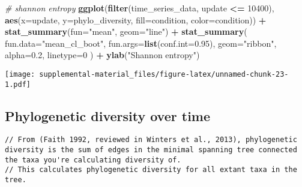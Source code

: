 \documentclass[]{book}
\newenvironment{Shaded}{\begin{snugshade}}{\end{snugshade}}
\newcommand{\CommentTok}[1]{\textcolor[rgb]{0.56,0.35,0.01}{\textit{#1}}}
\newcommand{\DataTypeTok}[1]{\textcolor[rgb]{0.13,0.29,0.53}{#1}}
\newcommand{\DecValTok}[1]{\textcolor[rgb]{0.00,0.00,0.81}{#1}}
\newcommand{\FloatTok}[1]{\textcolor[rgb]{0.00,0.00,0.81}{#1}}
\newcommand{\KeywordTok}[1]{\textcolor[rgb]{0.13,0.29,0.53}{\textbf{#1}}}
\newcommand{\NormalTok}[1]{#1}
\newcommand{\OperatorTok}[1]{\textcolor[rgb]{0.81,0.36,0.00}{\textbf{#1}}}
\newcommand{\StringTok}[1]{\textcolor[rgb]{0.31,0.60,0.02}{#1}}
\begin{document}
\begin{Shaded}
\begin{Highlighting}[]
\CommentTok{# shannon entropy}
\KeywordTok{ggplot}\NormalTok{(}\KeywordTok{filter}\NormalTok{(time_series_data, update }\OperatorTok{<=}\StringTok{ }\DecValTok{10400}\NormalTok{), }\KeywordTok{aes}\NormalTok{(}\DataTypeTok{x=}\NormalTok{update, }\DataTypeTok{y=}\NormalTok{phylo_diversity, }\DataTypeTok{fill=}\NormalTok{condition, }\DataTypeTok{color=}\NormalTok{condition)) }\OperatorTok{+}
\StringTok{  }\KeywordTok{stat_summary}\NormalTok{(}\DataTypeTok{fun=}\StringTok{"mean"}\NormalTok{, }\DataTypeTok{geom=}\StringTok{"line"}\NormalTok{) }\OperatorTok{+}
\StringTok{  }\KeywordTok{stat_summary}\NormalTok{(}
    \DataTypeTok{fun.data=}\StringTok{"mean_cl_boot"}\NormalTok{,}
    \DataTypeTok{fun.args=}\KeywordTok{list}\NormalTok{(}\DataTypeTok{conf.int=}\FloatTok{0.95}\NormalTok{),}
    \DataTypeTok{geom=}\StringTok{"ribbon"}\NormalTok{,}
    \DataTypeTok{alpha=}\FloatTok{0.2}\NormalTok{,}
    \DataTypeTok{linetype=}\DecValTok{0}
\NormalTok{  ) }\OperatorTok{+}
\StringTok{  }\KeywordTok{ylab}\NormalTok{(}\StringTok{"Shannon entropy"}\NormalTok{)}
\end{Highlighting}
\end{Shaded}

\texttt{[image: supplemental-material\_files/figure-latex/unnamed-chunk-23-1.pdf]}

\hypertarget{phylogenetic-diversity-over-time}{%
\subsection{Phylogenetic diversity over time}\label{phylogenetic-diversity-over-time}}

\begin{verbatim}
// From (Faith 1992, reviewed in Winters et al., 2013), phylogenetic diversity is the sum of edges in the minimal spanning tree connected the taxa you're calculating diversity of.
// This calculates phylogenetic diversity for all extant taxa in the tree.
\end{verbatim}
\end{document}
